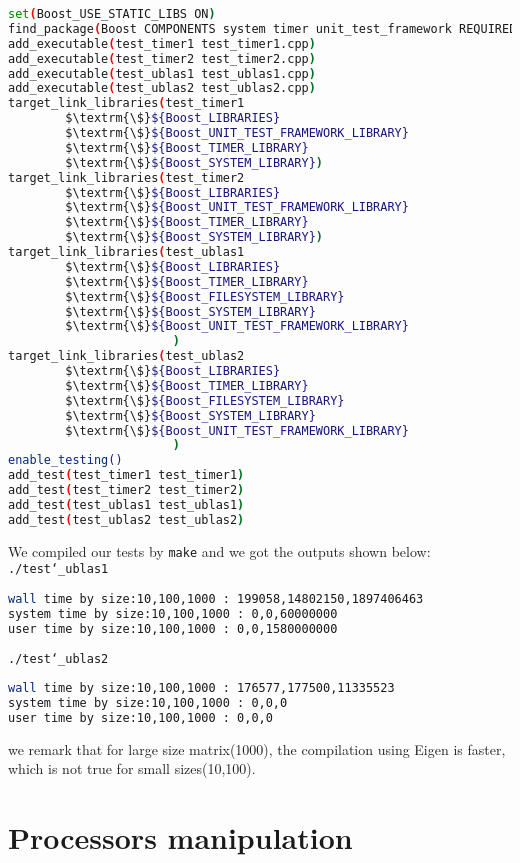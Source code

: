 \documentclass[11pt]{article}
\begin{document}
\begin{lstlisting}[language={sh}]
set(Boost_USE_STATIC_LIBS ON)
find_package(Boost COMPONENTS system timer unit_test_framework REQUIRED)
add_executable(test_timer1 test_timer1.cpp)
add_executable(test_timer2 test_timer2.cpp)
add_executable(test_ublas1 test_ublas1.cpp)
add_executable(test_ublas2 test_ublas2.cpp)
target_link_libraries(test_timer1
        $\textrm{\$}${Boost_LIBRARIES}
        $\textrm{\$}${Boost_UNIT_TEST_FRAMEWORK_LIBRARY}
        $\textrm{\$}${Boost_TIMER_LIBRARY}
        $\textrm{\$}${Boost_SYSTEM_LIBRARY})
target_link_libraries(test_timer2
        $\textrm{\$}${Boost_LIBRARIES}
        $\textrm{\$}${Boost_UNIT_TEST_FRAMEWORK_LIBRARY}
        $\textrm{\$}${Boost_TIMER_LIBRARY}
        $\textrm{\$}${Boost_SYSTEM_LIBRARY})
target_link_libraries(test_ublas1
        $\textrm{\$}${Boost_LIBRARIES}
        $\textrm{\$}${Boost_TIMER_LIBRARY}
        $\textrm{\$}${Boost_FILESYSTEM_LIBRARY}
        $\textrm{\$}${Boost_SYSTEM_LIBRARY}
        $\textrm{\$}${Boost_UNIT_TEST_FRAMEWORK_LIBRARY}
                       )
target_link_libraries(test_ublas2
        $\textrm{\$}${Boost_LIBRARIES}
        $\textrm{\$}${Boost_TIMER_LIBRARY}
        $\textrm{\$}${Boost_FILESYSTEM_LIBRARY}
        $\textrm{\$}${Boost_SYSTEM_LIBRARY}
        $\textrm{\$}${Boost_UNIT_TEST_FRAMEWORK_LIBRARY}
                       )
enable_testing()
add_test(test_timer1 test_timer1)
add_test(test_timer2 test_timer2)
add_test(test_ublas1 test_ublas1)
add_test(test_ublas2 test_ublas2)
\end{lstlisting}
\vspace{5mm}
We compiled our tests by \texttt{make} and we got the outputs shown below:\\
\texttt{./test\char`_ublas1}
\begin{lstlisting}[language={sh}]
wall time by size:10,100,1000 : 199058,14802150,1897406463
system time by size:10,100,1000 : 0,0,60000000
user time by size:10,100,1000 : 0,0,1580000000
\end{lstlisting}
\texttt{./test\char`_ublas2}
\begin{lstlisting}[language={sh}]
wall time by size:10,100,1000 : 176577,177500,11335523
system time by size:10,100,1000 : 0,0,0
user time by size:10,100,1000 : 0,0,0
\end{lstlisting}
we remark that for large size matrix(1000), the compilation using Eigen is faster, which is not true for small sizes(10,100).   
\section{Processors manipulation}
\end{document}

